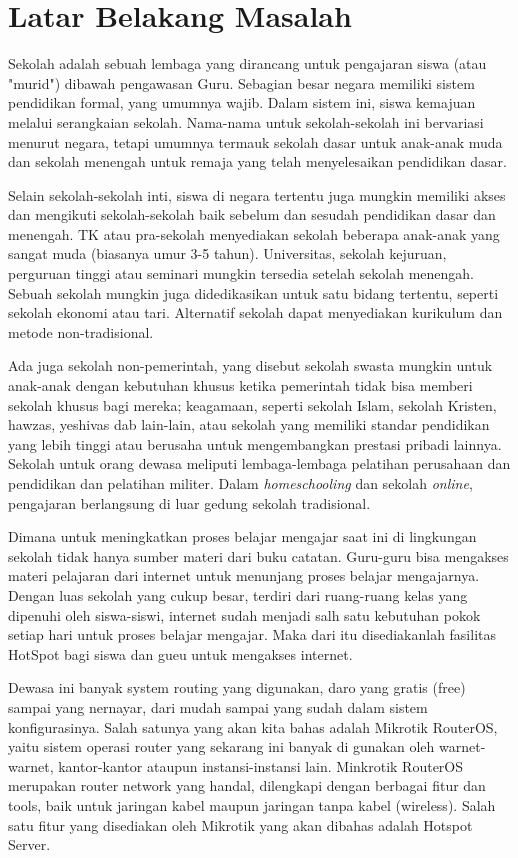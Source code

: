 \documentclass{jtetiproposalskripsi}
\begin{document}
\section{Latar Belakang Masalah}
Sekolah adalah sebuah lembaga yang dirancang untuk pengajaran siswa (atau "murid") dibawah pengawasan Guru. Sebagian besar negara memiliki sistem pendidikan formal, yang umumnya wajib. Dalam sistem ini, siswa kemajuan melalui serangkaian sekolah. Nama-nama untuk sekolah-sekolah ini bervariasi menurut negara, tetapi umumnya termauk sekolah dasar untuk anak-anak muda dan sekolah menengah untuk remaja yang telah menyelesaikan pendidikan dasar.

Selain sekolah-sekolah inti, siswa di negara tertentu juga mungkin memiliki akses dan mengikuti sekolah-sekolah baik sebelum dan sesudah pendidikan dasar dan menengah. TK atau pra-sekolah menyediakan sekolah beberapa anak-anak yang sangat muda (biasanya umur 3-5 tahun). Universitas, sekolah kejuruan, perguruan tinggi atau seminari mungkin tersedia setelah sekolah menengah. Sebuah sekolah mungkin juga didedikasikan untuk satu bidang tertentu, seperti sekolah ekonomi atau tari. Alternatif sekolah dapat
menyediakan kurikulum dan metode non-tradisional.

Ada juga sekolah non-pemerintah, yang disebut sekolah swasta mungkin untuk anak-anak dengan kebutuhan khusus ketika pemerintah tidak bisa memberi sekolah khusus bagi mereka; keagamaan, seperti sekolah Islam, sekolah Kristen, hawzas, yeshivas dab lain-lain, atau sekolah yang memiliki standar pendidikan yang lebih tinggi atau berusaha untuk mengembangkan prestasi pribadi lainnya. Sekolah untuk orang dewasa meliputi lembaga-lembaga pelatihan perusahaan dan pendidikan dan pelatihan militer. Dalam \emph{homeschooling} dan sekolah \emph{online}, pengajaran berlangsung di luar gedung sekolah tradisional.

Dimana untuk meningkatkan proses belajar mengajar saat ini di lingkungan sekolah tidak hanya sumber materi dari buku catatan. Guru-guru bisa mengakses materi pelajaran dari internet untuk menunjang proses belajar mengajarnya. Dengan luas sekolah yang cukup besar, terdiri dari ruang-ruang kelas yang dipenuhi oleh siswa-siswi, internet sudah menjadi salh satu kebutuhan pokok setiap hari untuk proses belajar mengajar. Maka dari itu disediakanlah fasilitas HotSpot bagi siswa dan gueu untuk mengakses internet.

Dewasa ini banyak system routing yang digunakan, daro yang gratis (free) sampai yang nernayar, dari mudah sampai yang sudah dalam sistem konfigurasinya. Salah satunya yang akan kita bahas adalah Mikrotik RouterOS, yaitu sistem operasi router yang sekarang ini banyak di gunakan oleh warnet-warnet, kantor-kantor ataupun instansi-instansi lain. Minkrotik RouterOS merupakan router network yang handal, dilengkapi dengan berbagai fitur dan tools, baik untuk jaringan kabel maupun jaringan tanpa kabel (wireless). Salah satu fitur yang disediakan oleh Mikrotik yang akan dibahas adalah Hotspot Server.
\end{document}
